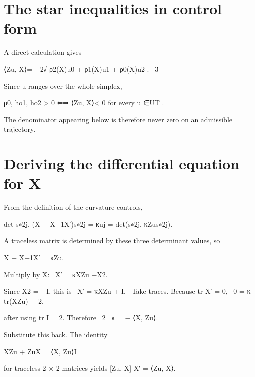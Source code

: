 \section{The star inequalities in control form}

A direct calculation gives


\begin{displaytext}
⟨Zu, X⟩= −2√ ρ2(X)u0 + ρ1(X)u1 + ρ0(X)u2 . \
3
\end{displaytext}

Since u ranges over the whole simplex,


\begin{displaytext}
ρ0, ho1, ho2 > 0 ⇐⇒ ⟨Zu, X⟩< 0 for every u ∈UT .
\end{displaytext}

The denominator appearing below is therefore never zero on an admissible trajectory.


\section{Deriving the differential equation for X}

From the definition of the curvature controls,


\begin{displaytext}
det s∗2j, (X + X−1X′)s∗2j = κuj = det(s∗2j, κZus∗2j).
\end{displaytext}

A traceless matrix is determined by these three determinant values, so


\begin{displaytext}
X + X−1X′ = κZu.
\end{displaytext}

\begin{displaytext}
Multiply by X: \
X′ = κXZu −X2.
\end{displaytext}

\begin{displaytext}
Since X2 = −I, this is \
X′ = κXZu + I. \
Take traces. Because tr X′ = 0, \
0 = κ tr(XZu) + 2,
\end{displaytext}

\begin{displaytext}
after using tr I = 2. Therefore \
2 \
κ = − ⟨X, Zu⟩.
\end{displaytext}

Substitute this back. The identity


XZu + ZuX = ⟨X, Zu⟩I


for traceless 2 × 2 matrices yields [Zu, X] X′ = ⟨Zu, X⟩.


